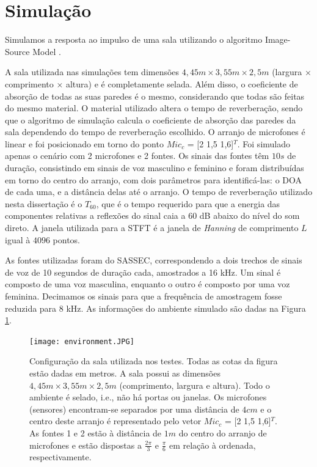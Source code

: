 \label{chap:4}
\section{Simulação}\label{sec:simulation}

Simulamos a resposta ao impulso de uma sala utilizando o algoritmo Image-Source Model \cite{simulation}.

A sala utilizada nas simulações tem dimensões $4,45m \times 3,55m \times 2,5m$ (largura × comprimento × altura) e é completamente selada. Além disso, o coeficiente de absorção de todas as suas paredes é o mesmo, considerando que todas são feitas do mesmo material. O material utilizado altera o tempo de reverberação, sendo que o algoritmo de simulação calcula o coeficiente de absorção das paredes da sala dependendo do tempo de reverberação escolhido. O arranjo de microfones é linear e foi posicionado em torno do ponto $Mic_c$ = [2 1,5 1,6]$^T$. Foi simulado apenas o cenário com 2 microfones e 2 fontes. Os sinais das fontes têm $10s$ de duração, consistindo em sinais de voz masculino e feminino e foram distribuídas em torno do centro do arranjo, com dois parâmetros para identificá-las: o DOA de cada uma, e a distância delas até o arranjo. O tempo de reverberação utilizado nesta dissertação é o ${T_{60}}$, que é o tempo requerido para que a energia das componentes relativas a reflexões do sinal caia a 60 dB abaixo do nível do som direto. A janela utilizada para a STFT é a janela de \textit{Hanning} de comprimento $L$ igual à $4096$ pontos.

As fontes utilizadas foram do SASSEC, correspondendo a dois trechos de sinais de voz de 10 segundos de duração cada, amostrados a 16 kHz. Um sinal é composto de uma voz masculina, enquanto o outro é composto por uma voz feminina. Decimamos os sinais para que a frequência de amostragem fosse reduzida para 8 kHz. As informações do ambiente simulado são dadas na Figura \ref{fig:environment}.

\begin{figure}
    \centering
    \texttt{[image: environment.JPG]}
    \caption{Configuração da sala utilizada nos testes. Todas as cotas da figura estão dadas em metros. A sala possui as dimensões $4,45m \times 3,55m \times 2,5m$ (comprimento, largura e altura). Todo o ambiente é selado, i.e., não há portas ou janelas. Os microfones (sensores) encontram-se separados por uma distância de $4cm$ e o centro deste arranjo é representado pelo vetor $Mic_c$ = [2 1,5 1,6]$^T$. As fontes 1 e 2 estão à distância de $1m$ do centro do arranjo de microfones e estão dispostas a $\frac{2\pi}{3}$ e $\frac{\pi}{6}$ em relação à ordenada, respectivamente.}
    \label{fig:environment}
\end{figure}


